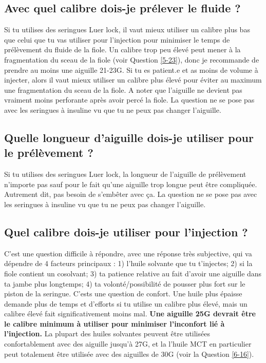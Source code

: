 \documentclass{article}
\begin{document}
\subsection{Avec quel calibre dois-je prélever le fluide ?}

Si tu utilises des seringues Luer lock, il vaut mieux utiliser un calibre plus bas que celui que tu vas utiliser pour l'injection pour minimiser le temps de prélèvement du fluide de la fiole. Un calibre trop peu élevé peut mener à la fragmentation du sceau de la fiole (voir Question \ref{5-23}), donc je recommande de prendre au moins une aiguille 21-23G. Si tu es patient.e et as moins de volume à injecter, alors il vaut mieux utiliser un calibre plus élevé pour éviter au maximum une fragmentation du sceau de la fiole. A noter que l'aiguille ne devient pas vraiment moins perforante après avoir percé la fiole. La question ne se pose pas avec les seringues à insuline vu que tu ne peux pas changer l'aiguille.

\subsection{Quelle longueur d'aiguille dois-je utiliser pour le prélèvement ?}

Si tu utilises des seringues Luer lock, la longueur de l'aiguille de prélèvement n'importe pas sauf pour le fait qu'une aiguille trop longue peut être compliquée. Autrement dit, pas besoin de s'embêter avec ça. La question ne se pose pas avec les seringues à insuline vu que tu ne peux pas changer l'aiguille.

\subsection{Quel calibre dois-je utiliser pour l'injection ?}\label{5-16}

C'est une question difficile à répondre, avec une réponse très subjective, qui va dépendre de 4 facteurs principaux : 1) l'huile solvante que tu t'injectes; 2) si la fiole contient un cosolvant; 3) ta patience relative au fait d'avoir une aiguille dans ta jambe plus longtemps; 4) ta volonté/possibilité de pousser plus fort sur le piston de la seringue. C'ests une question de confort. Une huile plus épaisse demande plus de temps et d'efforts si tu utilise un calibre plus élevé, mais un calibre élevé fait significativement moins mal. \textbf{Une aiguille 25G devrait être le calibre minimum à utiliser pour minimiser l'inconfort lié à l'injection.} La plupart des huiles solvantes peuvent être utilisées confortablement avec des aiguille jusqu'à 27G, et la l'huile MCT en particulier peut totalement être utilisée avec des aiguilles de 30G (voir la Question \ref{6-16}).
\end{document}
